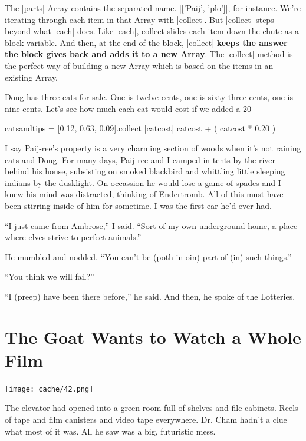 \documentclass[12pt,twoside]{report}
\begin{document}
The \rubyinline|parts| Array contains the separated
name.  \rubyinline|['Paij', 'plo']|, for instance.
We're iterating through each item in that Array with
\rubyinline|collect|.  But
\rubyinline|collect| steps beyond what
\rubyinline|each| does.  Like
\rubyinline|each|, collect slides each item down the
chute as a block variable.  And then, at the end of the block,
\rubyinline|collect| {\bf keeps the answer the block
  gives back and adds it to a new Array}.  The
\rubyinline|collect| method is the perfect way of
building a new Array which is based on the items in an existing Array.

Doug has three cats for sale.  One is twelve cents, one is sixty-three
cents, one is nine cents. Let's see how much each cat would cost if we
added a 20%


\begin{rubycode}

 catsandtips = [0.12, 0.63, 0.09].collect { |catcost| catcost + ( catcost * 0.20 ) }

\end{rubycode}


I say Paij-ree's property is a very charming section of woods when
it's not raining cats and Doug. For many days, Paij-ree and I camped
in tents by the river behind his house, subsisting on smoked blackbird
and whittling little sleeping indians by the dusklight.  On occassion
he would lose a game of spades and I knew his mind was distracted,
thinking of Endertromb.  All of this must have been stirring inside of
him for sometime.  I was the first ear he'd ever had.

``I just came from Ambrose,'' I said.  ``Sort of my own underground
home, a place where elves strive to perfect animals.''

He mumbled and nodded.  ``You can't be (poth-in-oin) part of (in) such
things.''

``You think we will fail?''

``I (preep) have been there before,'' he said.  And then, he spoke of
the Lotteries.

\newpage


\section{The Goat Wants to Watch a Whole Film}



	\texttt{[image: cache/42.png]}

The elevator had opened into a green room full of shelves and file
cabinets.  Reels of tape and film canisters and video tape everywhere.
Dr. Cham hadn't a clue what most of it was.  All he saw was a big,
futuristic mess.
\end{document}
